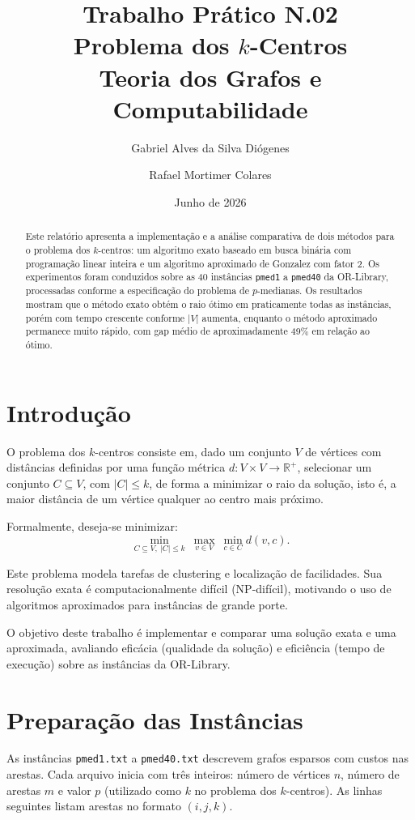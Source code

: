 \documentclass[12pt,a4paper]{article}
\title{Trabalho Prático N.02\\Problema dos $k$-Centros\\Teoria dos Grafos e Computabilidade}
\author{Gabriel Alves da Silva Diógenes \and Rafael Mortimer Colares}
\date{Junho de 2026}
\begin{document}
\maketitle

\begin{abstract}
Este relatório apresenta a implementação e a análise comparativa de dois métodos para o problema dos $k$-centros: um algoritmo exato baseado em busca binária com programação linear inteira e um algoritmo aproximado de Gonzalez com fator $2$. Os experimentos foram conduzidos sobre as 40 instâncias \texttt{pmed1} a \texttt{pmed40} da OR-Library, processadas conforme a especificação do problema de $p$-medianas. Os resultados mostram que o método exato obtém o raio ótimo em praticamente todas as instâncias, porém com tempo crescente conforme $|V|$ aumenta, enquanto o método aproximado permanece muito rápido, com gap médio de aproximadamente 49\% em relação ao ótimo.
\end{abstract}

\section{Introdução}

O problema dos $k$-centros consiste em, dado um conjunto $V$ de vértices com distâncias definidas por uma função métrica $d : V \times V \rightarrow \mathbb{R}^+$, selecionar um conjunto $C \subseteq V$, com $|C| \leq k$, de forma a minimizar o raio da solução, isto é, a maior distância de um vértice qualquer ao centro mais próximo.

Formalmente, deseja-se minimizar:
\[
\min_{C \subseteq V,\ |C| \leq k} \ \max_{v \in V} \ \min_{c \in C} d(v, c).
\]

Este problema modela tarefas de clustering e localização de facilidades. Sua resolução exata é computacionalmente difícil (NP-difícil), motivando o uso de algoritmos aproximados para instâncias de grande porte.

O objetivo deste trabalho é implementar e comparar uma solução exata e uma aproximada, avaliando eficácia (qualidade da solução) e eficiência (tempo de execução) sobre as instâncias da OR-Library.

\section{Preparação das Instâncias}

As instâncias \texttt{pmed1.txt} a \texttt{pmed40.txt} descrevem grafos esparsos com custos nas arestas. Cada arquivo inicia com três inteiros: número de vértices $n$, número de arestas $m$ e valor $p$ (utilizado como $k$ no problema dos $k$-centros). As linhas seguintes listam arestas no formato $(i, j, k)$.
\end{document}
